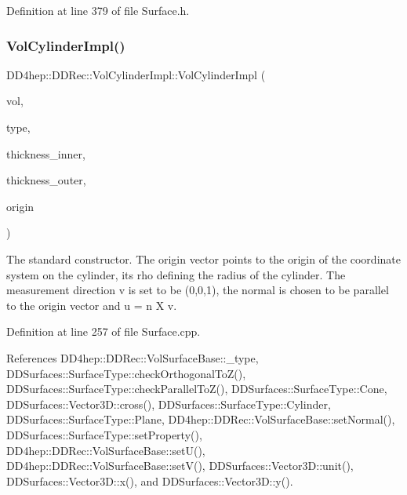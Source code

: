 Definition at line 379 of file Surface.\+h.

\hypertarget{class_d_d4hep_1_1_d_d_rec_1_1_vol_cylinder_impl_ac5d085d722bab6fe924dcd0bc58d0874}{}\label{class_d_d4hep_1_1_d_d_rec_1_1_vol_cylinder_impl_ac5d085d722bab6fe924dcd0bc58d0874} 
\subsubsection{\texorpdfstring{Vol\+Cylinder\+Impl()}{VolCylinderImpl()}\hspace{0.1cm}{\footnotesize\ttfamily [2/2]}}
{\footnotesize\ttfamily D\+D4hep\+::\+D\+D\+Rec\+::\+Vol\+Cylinder\+Impl\+::\+Vol\+Cylinder\+Impl (\begin{DoxyParamCaption}\item[{\hyperlink{class_d_d4hep_1_1_geometry_1_1_volume}{Geometry\+::\+Volume}}]{vol,  }\item[{\hyperlink{class_d_d_surfaces_1_1_surface_type}{Surface\+Type}}]{type,  }\item[{double}]{thickness\+\_\+inner,  }\item[{double}]{thickness\+\_\+outer,  }\item[{\hyperlink{class_d_d_surfaces_1_1_vector3_d}{Vector3D}}]{origin }\end{DoxyParamCaption})}

The standard constructor. The origin vector points to the origin of the coordinate system on the cylinder, its rho defining the radius of the cylinder. The measurement direction v is set to be (0,0,1), the normal is chosen to be parallel to the origin vector and u = n X v. 

Definition at line 257 of file Surface.\+cpp.



References D\+D4hep\+::\+D\+D\+Rec\+::\+Vol\+Surface\+Base\+::\+\_\+type, D\+D\+Surfaces\+::\+Surface\+Type\+::check\+Orthogonal\+To\+Z(), D\+D\+Surfaces\+::\+Surface\+Type\+::check\+Parallel\+To\+Z(), D\+D\+Surfaces\+::\+Surface\+Type\+::\+Cone, D\+D\+Surfaces\+::\+Vector3\+D\+::cross(), D\+D\+Surfaces\+::\+Surface\+Type\+::\+Cylinder, D\+D\+Surfaces\+::\+Surface\+Type\+::\+Plane, D\+D4hep\+::\+D\+D\+Rec\+::\+Vol\+Surface\+Base\+::set\+Normal(), D\+D\+Surfaces\+::\+Surface\+Type\+::set\+Property(), D\+D4hep\+::\+D\+D\+Rec\+::\+Vol\+Surface\+Base\+::set\+U(), D\+D4hep\+::\+D\+D\+Rec\+::\+Vol\+Surface\+Base\+::set\+V(), D\+D\+Surfaces\+::\+Vector3\+D\+::unit(), D\+D\+Surfaces\+::\+Vector3\+D\+::x(), and D\+D\+Surfaces\+::\+Vector3\+D\+::y().



